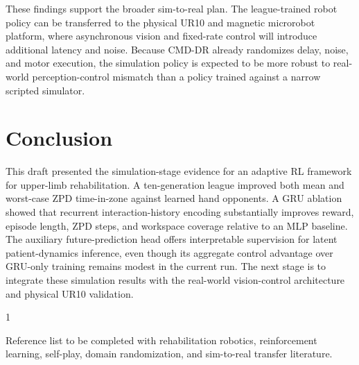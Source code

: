 \documentclass[lettersize,journal]{IEEEtran}
\begin{document}
These findings support the broader sim-to-real plan. The league-trained robot policy can be transferred to the physical UR10 and magnetic microrobot platform, where asynchronous vision and fixed-rate control will introduce additional latency and noise. Because CMD-DR already randomizes delay, noise, and motor execution, the simulation policy is expected to be more robust to real-world perception-control mismatch than a policy trained against a narrow scripted simulator.

\section{Conclusion}
This draft presented the simulation-stage evidence for an adaptive RL framework for upper-limb rehabilitation. A ten-generation league improved both mean and worst-case ZPD time-in-zone against learned hand opponents. A GRU ablation showed that recurrent interaction-history encoding substantially improves reward, episode length, ZPD steps, and workspace coverage relative to an MLP baseline. The auxiliary future-prediction head offers interpretable supervision for latent patient-dynamics inference, even though its aggregate control advantage over GRU-only training remains modest in the current run. The next stage is to integrate these simulation results with the real-world vision-control architecture and physical UR10 validation.

\balance

\begin{thebibliography}{1}

Reference list to be completed with rehabilitation robotics, reinforcement learning, self-play, domain randomization, and sim-to-real transfer literature.

\end{thebibliography}
\end{document}
